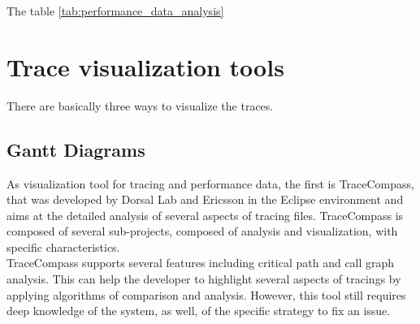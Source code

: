 The table \ref{tab:performance_data_analysis}
 \begin{table}[h]
\centering
\caption{Comparative methods for performance data analysis}
\label{tab:performance_data_analysis}
\end{table}

\section{Trace visualization tools}
There are basically three ways to visualize the traces.
\subsection{Gantt Diagrams}
As visualization tool for tracing and performance data, the first is TraceCompass, that was developed by Dorsal Lab and Ericsson in the Eclipse environment and aims at the detailed analysis of several aspects of tracing files. TraceCompass is composed of several sub-projects, composed of analysis and visualization, with specific characteristics.\\
TraceCompass supports several features including critical path and call graph analysis. This can help the developer to highlight several aspects of tracings by applying algorithms of comparison and analysis. However, this tool still requires deep knowledge of the system, as well, of the specific strategy to fix an issue.\\

